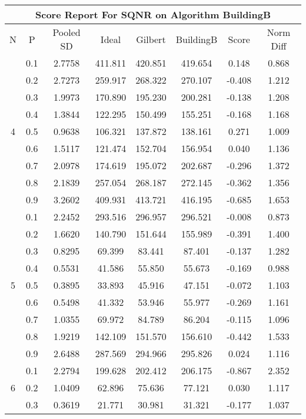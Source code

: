 \documentclass[11pt,a4paper]{report}
\begin{document}
\begin{longtable}{ | c | c || c | c | c | c | c | c | }
\hline
\multicolumn{8}{|c|}{ Score Report For SQNR on Algorithm BuildingB} \\
\hline
N & P & Pooled SD &  Ideal &  Gilbert & BuildingB  & Score & Norm Diff \\
 \hline
 \hline
 \endhead
\multirow{9}{*}{4} & 0.1 & 2.7758 & 411.811 & 420.851 & 419.654 & 0.148 & 0.868 \\
 & 0.2 & 2.7273 & 259.917 & 268.322 & 270.107 & -0.408 & 1.212 \\
 & 0.3 & 1.9973 & 170.890 & 195.230 & 200.281 & -0.138 & 1.208 \\
 & 0.4 & 1.3844 & 122.295 & 150.499 & 155.251 & -0.168 & 1.168 \\
 & 0.5 & 0.9638 & 106.321 & 137.872 & 138.161 & 0.271 & 1.009 \\
 & 0.6 & 1.5117 & 121.474 & 152.704 & 156.954 & 0.040 & 1.136 \\
 & 0.7 & 2.0978 & 174.619 & 195.072 & 202.687 & -0.296 & 1.372 \\
 & 0.8 & 2.1839 & 257.054 & 268.187 & 272.145 & -0.362 & 1.356 \\
 & 0.9 & 3.2602 & 409.931 & 413.721 & 416.195 & -0.685 & 1.653 \\
 \hline
\multirow{9}{*}{5} & 0.1 & 2.2452 & 293.516 & 296.957 & 296.521 & -0.008 & 0.873 \\
 & 0.2 & 1.6620 & 140.790 & 151.644 & 155.989 & -0.391 & 1.400 \\
 & 0.3 & 0.8295 & 69.399 & 83.441 & 87.401 & -0.137 & 1.282 \\
 & 0.4 & 0.5531 & 41.586 & 55.850 & 55.673 & -0.169 & 0.988 \\
 & 0.5 & 0.3895 & 33.893 & 45.916 & 47.151 & -0.072 & 1.103 \\
 & 0.6 & 0.5498 & 41.332 & 53.946 & 55.977 & -0.269 & 1.161 \\
 & 0.7 & 1.0355 & 69.972 & 84.789 & 86.204 & -0.115 & 1.096 \\
 & 0.8 & 1.9219 & 142.109 & 151.570 & 156.610 & -0.442 & 1.533 \\
 & 0.9 & 2.6488 & 287.569 & 294.966 & 295.826 & 0.024 & 1.116 \\
 \hline
\multirow{9}{*}{6} & 0.1 & 2.2794 & 199.628 & 202.412 & 206.175 & -0.867 & 2.352 \\
 & 0.2 & 1.0409 & 62.896 & 75.636 & 77.121 & 0.030 & 1.117 \\
 & 0.3 & 0.3619 & 21.771 & 30.981 & 31.321 & -0.177 & 1.037 \\

\end{longtable}
\end{document}
